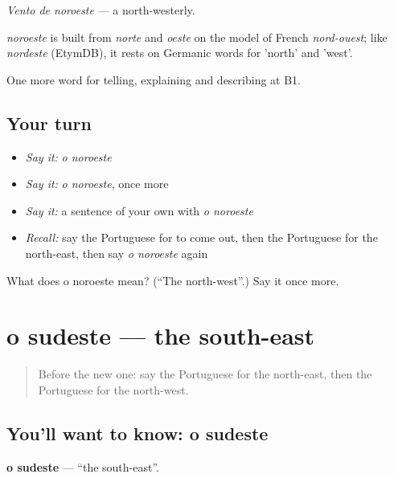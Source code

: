 \emph{Vento de noroeste} — a north-westerly.

\begin{cousinweb}
\emph{noroeste} is built from \emph{norte} and \emph{oeste} on the model of French \emph{nord-ouest}; like \emph{nordeste} (EtymDB), it rests on Germanic words for 'north' and 'west'.
\end{cousinweb}

\begin{grammarlens}[title={What you've built}]
One more word for telling, explaining and describing at B1.
\end{grammarlens}

\subsection*{Your turn}
\begin{itemize}
\raggedright
  \item \emph{Say it:} \emph{o noroeste}
  \item \emph{Say it:} \emph{o noroeste}, once more
  \item \emph{Say it:} a sentence of your own with \emph{o noroeste}
  \item \emph{Recall:} say the Portuguese for to come out, then the Portuguese for the north-east, then say \emph{o noroeste} again
\end{itemize}

\begin{tcolorbox}[breakable,colback=teal!4,colframe=teal!35!black,title={Before you move on}]
What does o noroeste mean? (\textquotedblleft{}The north-west\textquotedblright{}.) Say it once more.
\end{tcolorbox}
\section[o sudeste]{o sudeste — the south-east}

\label{lesson:PT-C439-sudeste}



\begin{quote}
Before the new one: say the Portuguese for the north-east, then the Portuguese for the north-west.
\end{quote}

\subsection*{You'll want to know: o sudeste}
\textbf{o sudeste} — \textquotedblleft{}the south-east\textquotedblright{}.

